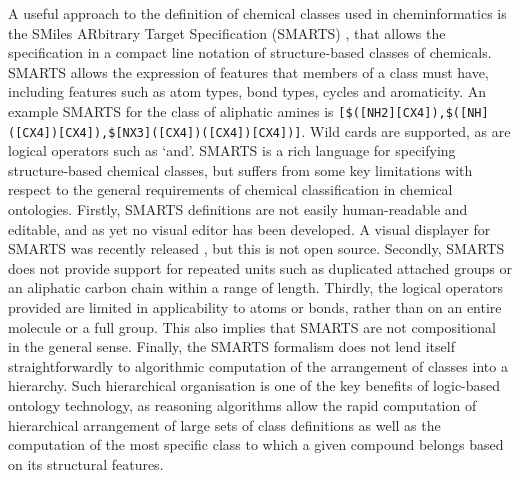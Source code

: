 \documentclass[10pt]{bmc_article}
\newenvironment{bmcformat}{\baselineskip20pt\sloppy\setboolean{publ}{false}}{\baselineskip20pt\sloppy}
\begin{document}
\begin{bmcformat}



A useful approach to the definition of chemical classes used in cheminformatics is the SMiles ARbitrary Target Specification (SMARTS) \cite{smarts2011}, that allows the specification in a compact line notation of structure-based classes of chemicals. SMARTS allows the expression of features that members of a class must have, including features such as atom types, bond types, cycles and aromaticity. An example SMARTS for the class of aliphatic amines is \texttt{[\$([NH2][CX4]),\$([NH]([CX4])[CX4]),\$[NX3]([CX4])([CX4])[CX4])]}. Wild cards are supported, as are logical operators such as `and'. SMARTS is a rich language for specifying structure-based chemical classes, but suffers from some key limitations with respect to the general requirements of chemical classification in chemical ontologies. Firstly, SMARTS definitions are not easily human-readable and editable, and as yet no visual editor has been developed. A visual displayer for SMARTS was recently released \cite{smartsviewer2010}, but this is not open source. Secondly, SMARTS does not provide support for repeated units such as duplicated attached groups or an aliphatic carbon chain within a range of length. Thirdly, the logical operators provided are limited in applicability to atoms or bonds, rather than on an entire molecule or a full group. This also implies that SMARTS are not compositional in the general sense. Finally, the SMARTS formalism does not lend itself straightforwardly to algorithmic computation of the arrangement of classes into a hierarchy. Such hierarchical organisation is one of the key benefits of logic-based ontology technology, as reasoning algorithms allow the rapid computation of hierarchical arrangement of large sets of class definitions as well as the computation of the most specific class to which a given compound belongs based on its structural features. 




\end{bmcformat}
\end{document}
